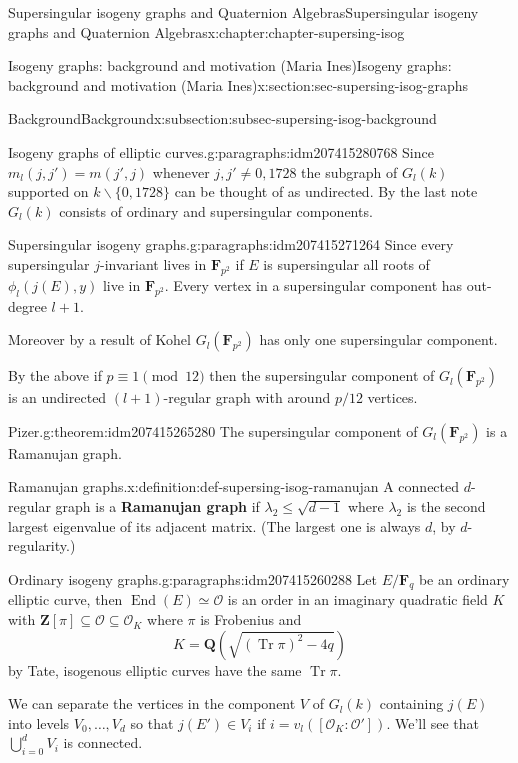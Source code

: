 \documentclass[oneside,10pt,]{book}
\newcommand{\terminology}[1]{\textbf{#1}}
\numberwithin{equation}{section}
\newcommand{\lb}{[}
\newcommand{\rb}{]}
\newcommand{\ZZ}{\mathbf{Z}}
\newcommand{\QQ}{\mathbf{Q}}
\newcommand{\FF}{\mathbf{F}}
\newcommand{\ints}{\mathcal{O}}
\DeclareMathOperator{\End}{End}
\DeclareMathOperator{\trace}{Tr}
\begin{document}
\begin{chapterptx}{Supersingular isogeny graphs and Quaternion Algebras}{}{Supersingular isogeny graphs and Quaternion Algebras}{}{}{x:chapter:chapter-supersing-isog}
\begin{sectionptx}{Isogeny graphs: background and motivation (Maria Ines)}{}{Isogeny graphs: background and motivation (Maria Ines)}{}{}{x:section:sec-supersing-isog-graphs}
\begin{subsectionptx}{Background}{}{Background}{}{}{x:subsection:subsec-supersing-isog-background}
\begin{paragraphs}{Isogeny graphs of elliptic curves.}{g:paragraphs:idm207415280768}
Since \(m_l(j,j') =  m(j',j)\) whenever \(j,j' \ne  0,1728\) the subgraph of \(G_l(k)\) supported on \(k\smallsetminus \{0,1728\}\) can be thought of as undirected. By the last note \(G_l(k)\) consists of ordinary and supersingular components.%
\end{paragraphs}%
\begin{paragraphs}{Supersingular isogeny graphs.}{g:paragraphs:idm207415271264}%
Since every supersingular \(j\)-invariant lives in \(\FF_{p^2}\) if \(E\) is supersingular all roots of \(\phi_l(j(E), y)\) live in \(\FF_{p^2}\). Every vertex in a supersingular component has out-degree \(l+1\).%
\par
Moreover by a result of Kohel \(G_l(\FF_{p^2})\) has only one supersingular component.%
\par
By the above if \(p \equiv 1 \pmod {12}\) then the supersingular component of \(G_l(\FF_{p^2})\) is an undirected \((l+1)\)-regular graph with around \(p/12\) vertices.%
\begin{theorem}{Pizer.}{}{g:theorem:idm207415265280}%
The supersingular component of \(G_l(\FF_{p^2})\) is a Ramanujan graph.%
\end{theorem}
\begin{definition}{Ramanujan graphs.}{x:definition:def-supersing-isog-ramanujan}%
A connected \(d\)-regular graph is a \terminology{Ramanujan graph} if \(\lambda_2 \le \sqrt{d-1}\) where \(\lambda_2\) is the second largest eigenvalue of its adjacent matrix. (The largest one is always \(d\), by \(d\)-regularity.)%
\end{definition}
\end{paragraphs}%
\begin{paragraphs}{Ordinary isogeny graphs.}{g:paragraphs:idm207415260288}%
Let \(E/\FF_q\) be an ordinary elliptic curve, then \(\End(E) \simeq \ints\) is an order in an imaginary quadratic field \(K\) with \(\ZZ\lb \pi \rb \subseteq \ints \subseteq \ints_K\) where \(\pi\) is Frobenius and%
\begin{equation*}
K = \QQ(\sqrt{(\trace \pi)^2 - 4q})
\end{equation*}
by Tate, isogenous elliptic curves have the same \(\trace \pi\).%
\par
We can separate the vertices in the component \(V\) of \(G_l(k)\) containing \(j(E)\) into levels \(V_0, \ldots, V_d\) so that \(j(E') \in V_i\) if \(i = v_l(\lb \ints_K : \ints'\rb)\). We'll see that \(\bigcup_{i=0}^d V_i\) is connected.%
\par

\end{paragraphs}
\end{subsectionptx}
\end{sectionptx}
\end{chapterptx}
\end{document}

